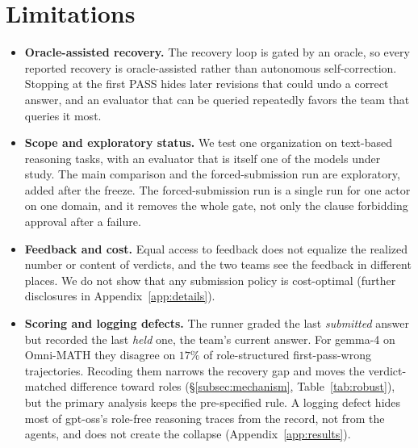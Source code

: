 \section{Limitations}
\label{sec:limitations}

\begin{itemize}
\item \textbf{Oracle-assisted recovery.} The recovery loop is gated by an
oracle, so every reported recovery is oracle-assisted rather than
autonomous self-correction. Stopping at the first PASS hides later
revisions that could undo a correct answer, and an evaluator that can be
queried repeatedly favors the team that queries it most.

\item \textbf{Scope and exploratory status.} We test one \PER{}
organization on text-based reasoning tasks, with an evaluator that is
itself one of the models under study. The main comparison and the
forced-submission run are exploratory, added after the freeze. The
forced-submission run is a single run for one actor on one domain, and it
removes the whole gate, not only the clause forbidding approval after a
failure.

\item \textbf{Feedback and cost.} Equal access to feedback does not
equalize the realized number or content of verdicts, and the two teams see
the feedback in different places. We do not show that any submission
policy is cost-optimal (further disclosures in Appendix~\ref{app:details}).

\item \textbf{Scoring and logging defects.} The runner graded the last
\emph{submitted} answer but recorded the last \emph{held} one, the team's
current answer. For gemma-4 on Omni-MATH they disagree on $17\%$ of
role-structured first-pass-wrong trajectories. Recoding them narrows the
recovery gap and moves the verdict-matched difference toward roles
(\S\ref{subsec:mechanism}, Table~\ref{tab:robust}), but the primary
analysis keeps the pre-specified rule. A logging defect hides most of
gpt-oss's role-free reasoning traces from the record, not from the agents,
and does not create the collapse (Appendix~\ref{app:results}).
\end{itemize}
